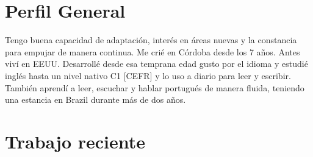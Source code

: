 \documentclass[a4paper,hidelinks]{twentysecondcv} %
\begin{document}



\makeprofile %

\vfill 


% 


\section{Perfil General}

Tengo buena capacidad de adaptación, interés en áreas nuevas y la constancia para empujar de manera continua. Me crié en Córdoba desde los 7 años. Antes viví en EEUU. Desarrollé desde esa temprana edad gusto por el idioma y estudié inglés hasta un nivel nativo C1 [CEFR] y lo uso a diario para leer y escribir. También aprendí a leer, escuchar y hablar portugués de manera fluida, teniendo una estancia en Brazil durante más de dos años.\\

\section{Trabajo reciente}

\begin{twentyshort} %
\end{twentyshort}
\end{document}
